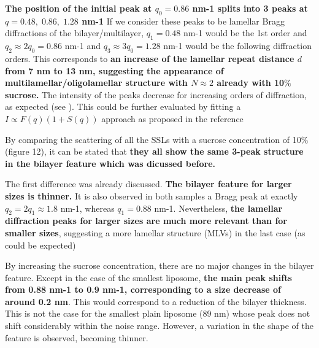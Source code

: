 \textbf{The position of the initial peak at $q_0=0.86$ nm-1 splits into 3 peaks at $q=0.48 ,\; 0.86  ,\; 1.28$ nm-1} If we consider these peaks to be lamellar Bragg diffractions of the bilayer/multilayer, $q_1=0.48$ nm-1 would be the 1st order and $q_{2}\approx2q_0=0.86$ nm-1 and  $q_{3}\approx3q_0=1.28$ nm-1 would be the following diffraction orders. This corresponds to \textbf{an increase of the lamellar repeat distance $d$ from 7 nm to 13 nm, suggesting the appearance of multilamellar/oligolamellar structure with $N\approx2$ already with 10$\%$ sucrose.} The intensity of the peaks decrease for increasing orders of diffraction, as expected (see  \cite{fernandez_influence_2008}). This could be further evaluated by fitting a $I \propto F(q) (1+S(q))$ approach as proposed in the reference \cite{fernandez_influence_2008}

By comparing the scattering of all the SSLs with a sucrose concentration of 10$\%$ (figure 12), it can be stated that \textbf{they all show the same 3-peak structure in the bilayer feature which was dicussed before.}



The first difference was already discussed. \textbf{The bilayer feature for larger sizes is thinner.} It is also observed in both samples a Bragg peak at exactly $q_2=2q_1\approx1.8$ nm-1, whereas $q_1=0.88$ nm-1. Nevertheless, \textbf{the lamellar diffraction peaks for larger sizes are much more relevant than for smaller sizes}, suggesting a more lamellar structure (MLVs) in the last case (as could be expected)

By increasing the sucrose concentration, there are no major changes in the bilayer feature. Except in the case of the smallest liposome, \textbf{the main peak shifts from 0.88 nm-1 to 0.9 nm-1, corresponding to a size decrease of around 0.2 nm}. This would correspond to a reduction of the bilayer thickness. This is not the case for the smallest plain liposome (89 nm) whose peak does not shift considerably within the noise range. However, a variation in the shape of the feature is observed, becoming thinner.

